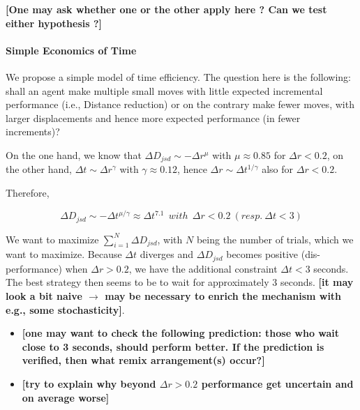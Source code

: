 {\bf [One may ask whether one or the other apply here ? Can we test either hypothesis ?]}


\paragraph{Simple Economics of Time}
We propose a simple model of time efficiency. The question here is the following: shall an agent make multiple small moves with little expected incremental performance (i.e., Distance reduction) or on the contrary make fewer moves, with larger displacements and hence more expected performance (in fewer increments)?

On the one hand, we know that $\Delta D_{jsd} \sim - \Delta r ^{\mu}$ with $\mu \approx 0.85$ for $\Delta r < 0.2$, on the other hand, $\Delta t \sim \Delta r^{\gamma}$ with $\gamma \approx 0.12$, hence $\Delta r \sim \Delta t^{1/\gamma}$ also for $\Delta r < 0.2$.

Therefore, 

\begin{equation}
\Delta D_{jsd} \sim -  \Delta t^{\mu / \gamma} \approx \Delta t^{7.1}~~with~~\Delta r < 0.2~(resp.~\Delta t  < 3)
\end{equation}

We want to maximize $\sum_{i=1}^{N} \Delta D_{jsd}$, with $N$ being the number of trials, which we want to maximize. Because $\Delta t$ diverges and $\Delta D_{jsd}$ becomes positive (dis-performance) when $\Delta r > 0.2$, we have the additional constraint $\Delta t  < 3$ seconds. The best strategy then seems to be to wait for approximately 3 seconds. {\bf [it may look a bit naive $\rightarrow$ may be necessary to enrich the mechanism with e.g., some stochasticity]}.


\begin{itemize}
  \item {\bf [one may want to check the following prediction: those who wait close to 3 seconds, should perform better. If the prediction is verified, then what remix arrangement(s) occur?]}
  \item {\bf [try to explain why beyond $\Delta r > 0.2$ performance get uncertain and on average worse]}
\end{itemize}








